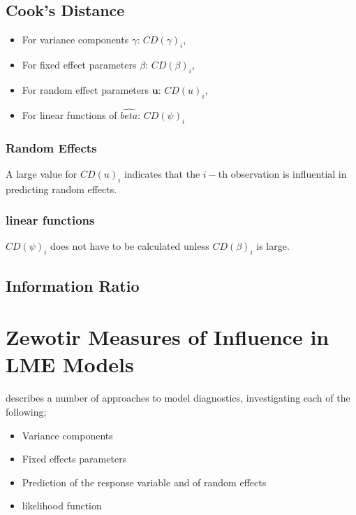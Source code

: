 \documentclass[12pt, a4paper]{article}
\begin{document}
\subsection{Cook's Distance}
\begin{itemize}
	\item For variance components $\gamma$: $CD(\gamma)_i$,
	\item For fixed effect parameters $\beta$: $CD(\beta)_i$,
	\item For random effect parameters $\boldsymbol{u}$: $CD(u)_i$,
	\item For linear functions of $\hat{beta}$: $CD(\psi)_i$
\end{itemize}

\subsubsection{Random Effects}
A large value for $CD(u)_i$ indicates that the $i-$th observation is influential in predicting random effects.


\subsubsection{linear functions}


$CD(\psi)_i$ does not have to be calculated unless $CD(\beta)_i$ is large.




\subsection{Information Ratio}




\newpage
\section{Zewotir Measures of Influence in LME Models}%
\citet{Zewotir} describes a number of approaches to model diagnostics, investigating each of the following;
\begin{itemize}
	\item Variance components
	\item Fixed effects parameters
	\item Prediction of the response variable and of random effects
	\item likelihood function
\end{itemize}
\end{document}
